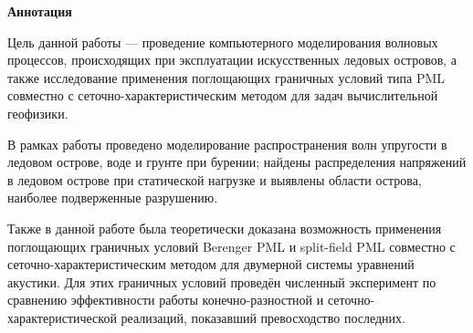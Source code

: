 \thispagestyle{plain}
\begin{center}
    \LARGE
    \textbf{Аннотация}
\end{center}

Цель данной работы --- проведение компьютерного моделирования волновых процессов, происходящих при эксплуатации искусственных ледовых островов, а также исследование применения поглощающих граничных условий типа PML совместно с сеточно-характеристическим методом для задач вычислительной геофизики.

В рамках работы проведено моделирование распространения волн упругости в ледовом острове, воде и грунте при бурении; найдены распределения напряжений в ледовом острове при статической нагрузке и выявлены области острова, наиболее подверженные разрушению.

Также в данной работе была теоретически доказана возможность применения поглощающих граничных условий Bere\-nger PML и split-field PML совместно с сеточно-характеристическим методом для двумерной системы уравнений акустики. Для этих граничных условий проведён численный эксперимент по сравнению эффективности работы конечно-разностной и сеточно-харак\-теристической реализаций, показавший превосходство последних.

\newpage